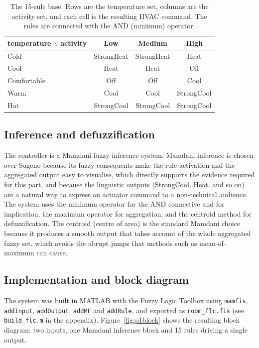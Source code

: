 \documentclass[11pt,a4paper]{article}
\begin{document}
\begin{table}[h]
  \centering
  \caption{The 15-rule base. Rows are the temperature set, columns are the activity set, and each cell is
  the resulting HVAC command. The rules are connected with the AND (minimum) operator.}
  \label{tab:rules}
  \begin{tabular}{l ccc}
    \toprule
    \textbf{temperature} $\backslash$ \textbf{activity} & \textbf{Low} & \textbf{Medium} & \textbf{High} \\
    \midrule
    Cold        & StrongHeat & StrongHeat & Heat       \\
    Cool        & Heat       & Heat       & Off        \\
    Comfortable & Off        & Off        & Cool       \\
    Warm        & Cool       & Cool       & StrongCool \\
    Hot         & StrongCool & StrongCool & StrongCool \\
    \bottomrule
  \end{tabular}
\end{table}

\subsection{Inference and defuzzification}
The controller is a Mamdani fuzzy inference system. Mamdani inference is chosen over Sugeno because its
fuzzy consequents make the rule activation and the aggregated output easy to visualise, which directly
supports the evidence required for this part, and because the linguistic outputs (StrongCool, Heat, and
so on) are a natural way to express an actuator command to a non-technical audience. The system uses the
minimum operator for the AND connective and for implication, the maximum operator for aggregation, and
the centroid method for defuzzification. The centroid (centre of area) is the standard Mamdani choice
because it produces a smooth output that takes account of the whole aggregated fuzzy set, which avoids the
abrupt jumps that methods such as mean-of-maximum can cause.

\subsection{Implementation and block diagram}
The system was built in MATLAB with the Fuzzy Logic Toolbox using \texttt{mamfis}, \texttt{addInput},
\texttt{addOutput}, \texttt{addMF} and \texttt{addRule}, and exported as \texttt{room\_flc.fis}
(see \texttt{build\_flc.m} in the appendix). Figure~\ref{fig:p1block} shows the resulting block diagram:
two inputs, one Mamdani inference block and 15 rules driving a single output.
\end{document}
